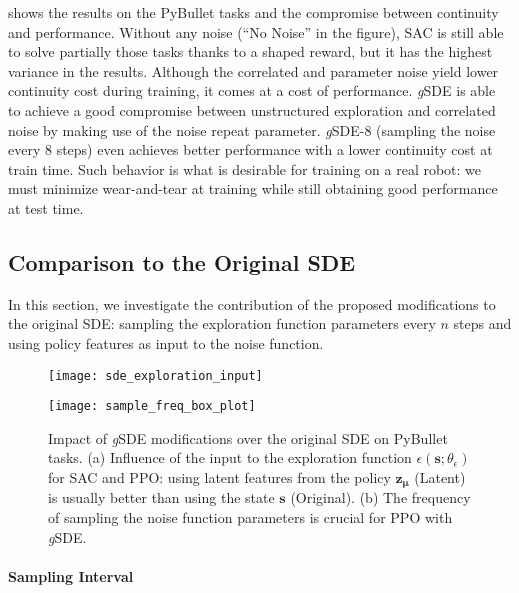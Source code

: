 \documentclass{article}
\newcommand{\state}{\mathbf{s}}
\newcommand{\pilatent}{\mathbf{z_\mu}}
\newcommand{\noise}{\epsilon}
\newcommand{\SDE}{\textsc{SDE}\xspace}
\newcommand{\ourSDE}{\textit{g}\textsc{SDE}\xspace}
\newcommand{\ppo}{\textsc{PPO}\xspace}
\newcommand{\sac}{\textsc{SAC}\xspace}
\newcommand{\walker}{\textsc{Walker2D}\xspace}
\begin{document}
 shows the results on the PyBullet tasks and the compromise between continuity and performance.
Without any noise (``No Noise'' in the figure), \sac is still able to solve partially those tasks thanks to a shaped reward, but it has the highest variance in the results.
Although the correlated and parameter noise yield lower continuity cost during training, it comes at a cost of performance.
\ourSDE is able to achieve a good compromise between unstructured exploration and correlated noise by making use of the noise repeat parameter.
\ourSDE-8 (sampling the noise every 8 steps) even achieves better performance with a lower continuity cost at train time.
Such behavior is what is desirable for training on a real robot: we must minimize wear-and-tear at training while still obtaining good performance at test time.


\subsection{Comparison to the Original \SDE}
\label{sec:ablation}

In this section, we investigate the contribution of the proposed modifications to the original \SDE: sampling the exploration function parameters every $n$ steps and using policy features as input to the noise function.


\begin{figure}[h]
  \begin{minipage}[t]{.45\linewidth}
    \centering\texttt{[image: sde\_exploration\_input]}
    \label{fig:sde-features}
  \end{minipage}
  \hfill
  \begin{minipage}[t]{.45\linewidth}
    \centering\texttt{[image: sample\_freq\_box\_plot]}
    \subcaption{Sampling interval (\ppo on \walker)}
    \label{fig:ppo-sample-freq}
  \end{minipage}
  \caption{Impact of \ourSDE modifications over the original \SDE on PyBullet tasks. (a) Influence of the input to the exploration function $\noise(\state; \theta_\noise)$ for \sac and \ppo: using latent features from the policy $\pilatent$ (Latent) is usually better than using the state $\state$ (Original). (b) The frequency of sampling the noise function parameters is crucial for \ppo with \ourSDE.}
\end{figure}

\paragraph{Sampling Interval}
\end{document}
